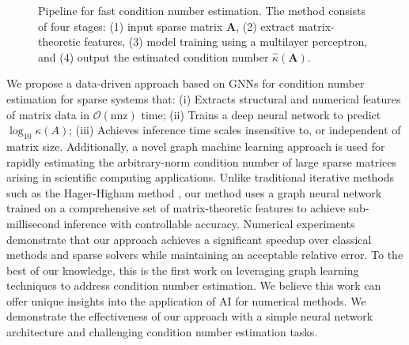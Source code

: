 \documentclass[11pt,a4paper]{article}
\theoremstyle{plain}
\theoremstyle{definition}
\theoremstyle{remark}
\begin{document}
\begin{figure}[htbp]
{
}
\caption{Pipeline for fast condition number estimation. The method consists of four stages: (1) input sparse matrix $\mathbf{A}$, (2) extract matrix-theoretic features, (3) model training using a multilayer perceptron, and (4) output the estimated condition number $\hat{\kappa}(\mathbf{A})$.}
\label{fig:method}
\end{figure}


We propose a data-driven approach based on GNNs for condition number estimation for sparse systems that: (i) Extracts structural and numerical features of matrix data in $\mathcal{O}(\text{nnz})$ time; (ii) Trains a deep neural network to predict $\log_{10} \kappa(A)$; (iii) Achieves inference time scales insensitive to, or independent of matrix size. Additionally, a novel graph machine learning approach is used for rapidly estimating the arbitrary-norm condition number of large sparse matrices arising in scientific computing applications. Unlike traditional iterative methods such as the Hager-Higham method \cite{hager1984condition, Higham1987}, our method uses a graph neural network trained on a comprehensive set of matrix-theoretic features to achieve sub-millisecond inference with controllable accuracy. Numerical experiments demonstrate that our approach achieves a significant speedup over classical methods and sparse solvers while maintaining an acceptable relative error. To the best of our knowledge, this is the first work on leveraging graph learning techniques to address condition number estimation. We believe this work can offer unique insights into the application of AI for numerical methods.  We demonstrate the effectiveness of our approach with a simple neural network architecture and challenging condition number estimation tasks. %
\end{document}
